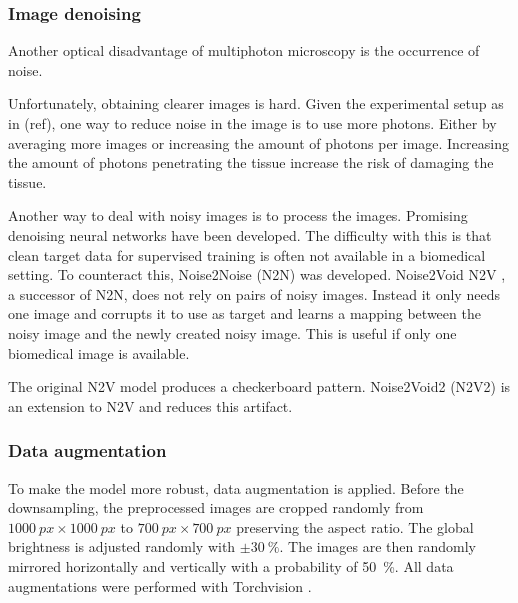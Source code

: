 \subsubsection{Image denoising}
Another optical disadvantage of multiphoton microscopy is the occurrence of noise.

Unfortunately, obtaining clearer images is hard.
Given the experimental setup as in (ref), one way to reduce noise in the image is to use more photons.
Either by averaging more images or increasing the amount of photons per image.
Increasing the amount of photons penetrating the tissue increase the risk of damaging the tissue.

Another way to deal with noisy images is to process the images.
Promising denoising neural networks have been developed.
The difficulty with this is that clean target data for supervised training is often not available in a biomedical setting.
To counteract this, Noise2Noise (N2N) \cite{Lehtinen2018} was developed.
Noise2Void N2V \cite{Krull2019}, a successor of N2N, does not rely on pairs of noisy images.
Instead it only needs one image and corrupts it to use as target and learns a mapping between the noisy image and the newly created noisy image.
This is useful if only one biomedical image is available.

The original N2V model produces a checkerboard pattern.
Noise2Void2 (N2V2) \cite{Hock2022} is an extension to N2V and reduces this artifact.

\subsubsection{Data augmentation}

To make the model more robust, data augmentation is applied.
Before the downsampling, the preprocessed images are cropped randomly from $\qty{1000}{px}\times \qty{1000}{px}$ to $\qty{700}{px}\times \qty{700}{px}$ preserving the aspect ratio.
The global brightness is adjusted randomly with $\pm \qty{30}{\percent}$.
The images are then randomly mirrored horizontally and vertically with a probability of \qty{50}{\percent}.
All data augmentations were performed with Torchvision \cite{torchvision2016}.

